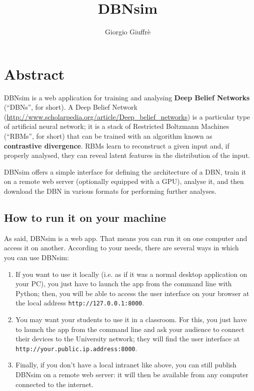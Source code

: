 \documentclass[a4paper]{article}
\title{DBNsim}
\author{Giorgio Giuffrè}
\date{}
\begin{document}
\maketitle
\tableofcontents
\newpage


\section{Abstract}

DBNsim is a web application for training and analysing \textbf{Deep Belief Networks} (``DBNs'', for short). A Deep Belief Network (\url{http://www.scholarpedia.org/article/Deep_belief_networks}) is a particular type of artificial neural network; it is a stack of Restricted Boltzmann Machines (``RBMs'', for short) that can be trained with an algorithm known as \textbf{contrastive divergence}. RBMs learn to reconstruct a given input and, if properly analysed, they can reveal latent features in the distribution of the input.

DBNsim offers a simple interface for defining the architecture of a DBN, train it on a remote web server (optionally equipped with a GPU), analyse it, and then download the DBN in various formats for performing further analyses.


\subsection{How to run it on your machine}

As said, DBNsim is a web app. That means you can run it on one computer and access it on another. According to your needs, there are several ways in which you can use DBNsim:
\begin{enumerate}
	\item If you want to use it locally (i.e. as if it was a normal desktop application on your PC), you just have to launch the app from the command line with Python; then, you will be able to access the user interface on your browser at the local address \texttt{http://127.0.0.1:8000}.
	\item You may want your students to use it in a classroom. For this, you just have to launch the app from the command line and ask your audience to connect their devices to the University network; they will find the user interface at \texttt{http://your.public.ip.address:8000}.
	\item Finally, if you don't have a local intranet like above, you can still publish DBNsim on a remote web server: it will then be available from any computer connected to the internet.
\end{enumerate}
\end{document}
